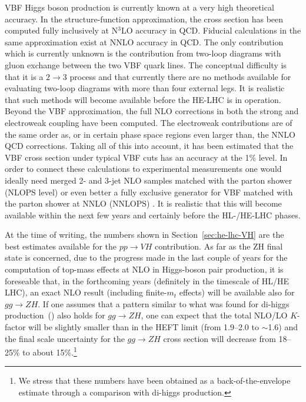 VBF Higgs boson production is currently known at a very high theoretical accuracy. In
the structure-function approximation, the cross section has been computed fully inclusively at
N$^3$LO accuracy in QCD. Fiducial calculations in the same approximation exist at NNLO accuracy in QCD. The
only contribution which is currently unknown is the contribution from two-loop
diagrams with gluon exchange between the two VBF quark lines. The conceptual
difficulty is that it is a $2 \to 3$ process and that currently there are no methods
available for evaluating two-loop diagrams with more than four external legs. It is
realistic that such methods will become available before the HE-LHC is in
operation. Beyond the VBF approximation, the full NLO corrections in both the
strong and electroweak coupling have been computed. The electroweak
contributions are of the same order as, or in certain phase space regions even
larger than, the NNLO QCD corrections. Taking all of this into account, it has
been estimated that the VBF cross section under typical VBF cuts has an accuracy
at the 1\% level. In order to connect these calculations to experimental
measurements one would ideally need merged 2- and 3-jet NLO samples matched with the parton shower~\cite{Nason:2009ai,Jager:2014vna} (NLOPS level) or even better a fully exclusive generator for VBF matched with the parton shower at  NNLO (NNLOPS) . It is realistic that this
will become available within the next few years and certainly before the
HL-/HE-LHC phases.
 


\label{sec:hl-lhc-VH}
At the time of writing, the numbers shown in Section~\ref{sec:he-lhc-VH}
are the best estimates
available for the $pp\rightarrow VH$ contribution. As far as the ZH final state is concerned, due to the progress made in the
last couple of years for the computation of top-mass effects at NLO in
Higgs-boson pair production, it is foreseable that, in the forthcoming years
(definitely in the timescale of HL/HE LHC), an exact NLO result
(including finite-$m_t$ effects) will be available also for $gg\rightarrow ZH$. If
one assumes that a pattern similar to what was found for di-higgs
production~(\cite{Borowka:2016ypz}) also holds for $gg\rightarrow ZH$, one can expect
that the total NLO/LO $K$-factor will be slightly smaller than in the
HEFT limit (from 1.9--2.0 to $\sim$1.6) and the final scale uncertainty for
the $gg\rightarrow ZH$ cross section will decrease from 18--25\% to about 15\%.\footnote{We stress that these numbers have been obtained as a back-of-the-envelope estimate through a comparison with di-higgs production.}

